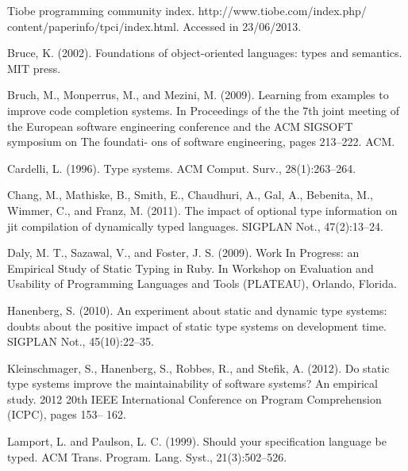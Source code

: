 \documentclass[preprint]{sigplanconf}
\begin{document}
\begin{thebibliography}{}
\softraggedright

Tiobe programming community index. http://www.tiobe.com/index.php/ content/paperinfo/tpci/index.html. Accessed in 23/06/2013.

Bruce, K. (2002). Foundations of object-oriented languages: types and semantics. MIT press.

Bruch, M., Monperrus, M., and Mezini, M. (2009). Learning from examples to improve code completion systems. In Proceedings of the the 7th joint meeting of the European software engineering conference and the ACM SIGSOFT symposium on The foundati- ons of software engineering, pages 213–222. ACM.

Cardelli, L. (1996). Type systems. ACM Comput. Surv., 28(1):263–264.

Chang, M., Mathiske, B., Smith, E., Chaudhuri, A., Gal, A., Bebenita, M., Wimmer, C., and Franz, M. (2011). The impact of optional type information on jit compilation of dynamically typed languages. SIGPLAN Not., 47(2):13–24.

Daly, M. T., Sazawal, V., and Foster, J. S. (2009). Work In Progress: an Empirical Study of Static Typing in Ruby. In Workshop on Evaluation and Usability of Programming Languages and Tools (PLATEAU), Orlando, Florida.

Hanenberg, S. (2010). An experiment about static and dynamic type systems: doubts about the positive impact of static type systems on development time. SIGPLAN Not., 45(10):22–35.

Kleinschmager, S., Hanenberg, S., Robbes, R., and Stefik, A. (2012). Do static type systems improve the maintainability of software systems? An empirical study. 2012 20th IEEE International Conference on Program Comprehension (ICPC), pages 153– 162.

Lamport, L. and Paulson, L. C. (1999). Should your specification language be typed. ACM Trans. Program. Lang. Syst., 21(3):502–526.


\end{thebibliography}
\end{document}
